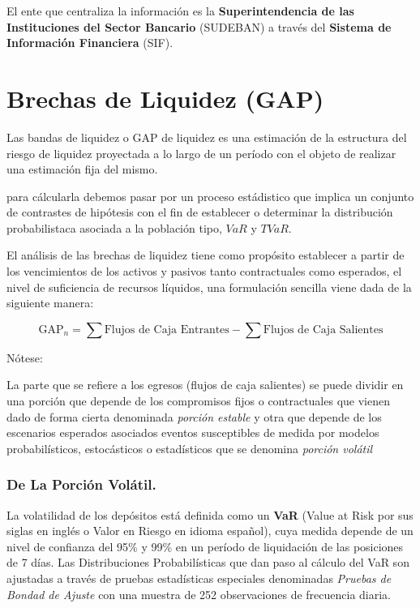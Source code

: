 \documentclass[10pt,]{article}
\begin{document}
El ente que centraliza la información es la \textbf{Superintendencia de
las Instituciones del Sector Bancario} (SUDEBAN) a través del
\textbf{Sistema de Información Financiera} (SIF).

\hypertarget{brechas-de-liquidez-gap}{%
\section{Brechas de Liquidez (GAP)}\label{brechas-de-liquidez-gap}}

Las bandas de liquidez o GAP de liquidez es una estimación de la
estructura del riesgo de liquidez proyectada a lo largo de un período
con el objeto de realizar una estimación fija del mismo.

para cálcularla debemos pasar por un proceso estádistico que implica un
conjunto de contrastes de hipótesis con el fin de establecer o
determinar la distribución probabilistaca asociada a la población tipo,
\(VaR\) y \(TVaR\).

El análisis de las brechas de liquidez tiene como propósito establecer a
partir de los vencimientos de los activos y pasivos tanto contractuales
como esperados, el nivel de suficiencia de recursos líquidos, una
formulación sencilla viene dada de la siguiente manera:

\[\text{GAP}_n = \sum \text{Flujos de Caja Entrantes} - \sum \text{Flujos de Caja Salientes}\]

Nótese:

La parte que se refiere a los egresos (flujos de caja salientes) se
puede dividir en una porción que depende de los compromisos fijos o
contractuales que vienen dado de forma cierta denominada \emph{porción
estable} y otra que depende de los escenarios esperados asociados
eventos susceptibles de medida por modelos probabilísticos, estocásticos
o estadísticos que se denomina \emph{porción volátil}

\hypertarget{de-la-porcion-volatil.}{%
\subsubsection{De La Porción Volátil.}\label{de-la-porcion-volatil.}}

La volatilidad de los depósitos está definida como un \textbf{VaR}
(Value at Risk por sus siglas en inglés o Valor en Riesgo en idioma
español), cuya medida depende de un nivel de confianza del 95\% y 99\%
en un período de liquidación de las posiciones de 7 días. Las
Distribuciones Probabilísticas que dan paso al cálculo del VaR son
ajustadas a través de pruebas estadísticas especiales denominadas
\emph{Pruebas de Bondad de Ajuste} con una muestra de 252 observaciones
de frecuencia diaria.
\end{document}
